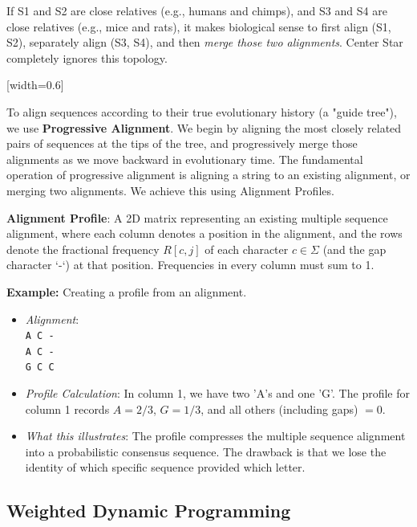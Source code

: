 If S1 and S2 are close relatives (e.g., humans and chimps), and S3 and S4 are close relatives (e.g., mice and rats), it makes biological sense to first align (S1, S2), separately align (S3, S4), and then \textit{merge those two alignments}. Center Star completely ignores this topology.

[width=0.6\textwidth]

To align sequences according to their true evolutionary history (a "guide tree"), we use \textbf{Progressive Alignment}. We begin by aligning the most closely related pairs of sequences at the tips of the tree, and progressively merge those alignments as we move backward in evolutionary time. The fundamental operation of progressive alignment is aligning a string to an existing alignment, or merging two alignments. We achieve this using Alignment Profiles.

\begin{important}
    \textbf{Alignment Profile}: A 2D matrix representing an existing multiple sequence alignment, where each column denotes a position in the alignment, and the rows denote the fractional frequency $R[c,j]$ of each character $c \in \Sigma$ (and the gap character `-`) at that position. Frequencies in every column must sum to 1.
\end{important}


\textbf{Example:} Creating a profile from an alignment.
\begin{itemize}
    \item \textit{Alignment}: \\
    \texttt{A C -} \\
    \texttt{A C -} \\
    \texttt{G C C}
    \item \textit{Profile Calculation}: In column 1, we have two 'A's and one 'G'. The profile for column 1 records $A=2/3$, $G=1/3$, and all others (including gaps) $=0$. 
    \item \textit{What this illustrates}: The profile compresses the multiple sequence alignment into a probabilistic consensus sequence. The drawback is that we lose the identity of which specific sequence provided which letter.
\end{itemize}

\subsection{Weighted Dynamic Programming}

